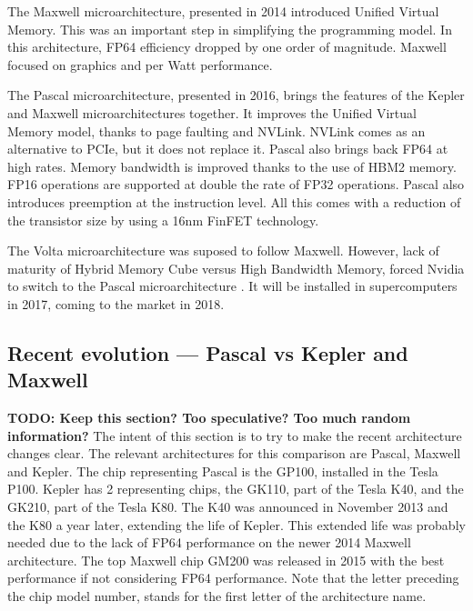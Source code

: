 The Maxwell microarchitecture, presented in 2014 introduced Unified Virtual Memory.
This was an important step in simplifying the programming model.
In this architecture, FP64 efficiency dropped by one order of magnitude.
Maxwell focused on graphics and per Watt performance.

The Pascal microarchitecture, presented in 2016, brings the features of the Kepler and Maxwell microarchitectures together.
It improves the Unified Virtual Memory model, thanks to page faulting and NVLink.
NVLink comes as an alternative to PCIe, but it does not replace it.
Pascal also brings back FP64 at high rates.
Memory bandwidth is improved thanks to the use of HBM2 memory.
FP16 operations are supported at double the rate of FP32 operations.
Pascal also introduces preemption at the instruction level.
All this comes with a reduction of the transistor size by using a 16nm FinFET technology.

The Volta microarchitecture was suposed to follow Maxwell.
However, lack of maturity of Hybrid Memory Cube versus High Bandwidth Memory, forced Nvidia to switch to the Pascal microarchitecture \cite{wccftech:volta}.
It will be installed in supercomputers in 2017, coming to the market in 2018.

\subsection{Recent evolution --- Pascal vs Kepler and Maxwell}
\textbf{TODO: Keep this section? Too speculative? Too much random information?}
The intent of this section is to try to make the recent architecture changes clear.
The relevant architectures for this comparison are Pascal, Maxwell and Kepler.
The chip representing Pascal is the GP100, installed in the Tesla P100.
Kepler has 2 representing chips, the GK110, part of the Tesla K40, and the GK210, part of the Tesla K80.
The K40 was announced in November 2013 and the K80 a year later, extending the life of Kepler.
This extended life was probably needed due to the lack of FP64 performance on the newer 2014 Maxwell architecture.
The top Maxwell chip GM200 was released in 2015 with the best performance if not considering FP64 performance.
Note that the letter preceding the chip model number, stands for the first letter of the architecture name.


